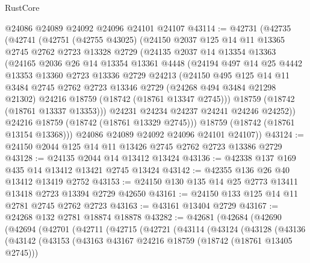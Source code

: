 \begin{lexlean}{RustCore}
\begin{coremodule}
    @24086
    @24089
    @24092
    @24096
    @24101
    @24107
@43114 := @42731
    (@42735
      (@42741
        (@42751
          (@42755 @43025)
          (@24150
            @2037
            @125
            @14
            @11
            @13365
            @2745
            @2762
            @2723
            @13328
            @2729
            (@24135
              @2037
              @14
              @13354
              @13363
              (@24165
                @2036
                @26
                @14
                @13354
                @13361
                @4448
                (@24194
                  @497
                  @14
                  @25
                  @4442
                  @13353
                  @13360
                  @2723
                  @13336
                  @2729
                  @24213
                  (@24150
                    @495
                    @125
                    @14
                    @11
                    @3484
                    @2745
                    @2762
                    @2723
                    @13346
                    @2729
                    (@24268 @494 @3484 @21298 @21302)
                    @24216
                    @18759
                    (@18742 (@18761 @13347 @2745)))
                  @18759
                  (@18742 (@18761 @13337 @13353)))
                @24231
                @24234
                @24237
                @24241
                @24246
                @24252))
            @24216
            @18759
            (@18742 (@18761 @13329 @2745)))
          @18759
          (@18742 (@18761 @13154 @13368)))
        @24086
        @24089
        @24092
        @24096
        @24101
        @24107))
@43124 := @24150 @2044 @125 @14 @11 @13426 @2745 @2762 @2723 @13386 @2729
@43128 := @24135 @2044 @14 @13412 @13424
@43136 := @42338 @137 @169 @435 @14 @13412 @13421 @2745 @13424
@43142 := @42355 @136 @26 @40 @13412 @13419 @2752
@43153 := @24150 @130 @135 @14 @25 @2773 @13411 @13418 @2723 @13394 @2729 @42650
@43161 := @24150 @133 @125 @14 @11 @2781 @2745 @2762 @2723
@43163 := @43161 @13404 @2729
@43167 := @24268 @132 @2781 @18874 @18878
@43282 := @42681
    (@42684
      (@42690
        (@42694
          (@42701
            (@42711
              (@42715
                (@42721
                  (@43114
                    (@43124
                      (@43128
                        (@43136
                          (@43142
                            (@43153
                              (@43163 @43167 @24216 @18759 (@18742 (@18761 @13405 @2745)))

\end{coremodule}
\end{lexlean}
